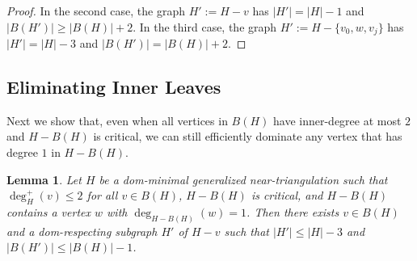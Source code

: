 \documentclass{article}
\newtheorem{lem}{Lemma}
\theoremstyle{definition}
\begin{document}
\begin{proof}
  In the second case, the graph $H':=H-v$ has $|H'|=|H|-1$ and $|B(H')|\ge |B(H)|+2$. In the third case, the graph $H':=H-\{v_0,w,v_j\}$ has $|H'|=|H|-3$ and $|B(H')|=|B(H)|+2$.
\end{proof}


\subsection{Eliminating Inner Leaves}
\label{one_kill_sec}

Next we show that, even when all vertices in $B(H)$ have inner-degree at most $2$ and $H-B(H)$ is critical, we can still efficiently dominate any vertex that has degree $1$ in $H-B(H)$.


\begin{lem}\label{leaf_killer}
  Let $H$ be a dom-minimal generalized near-triangulation such that $\deg^+_H(v)\le 2$ for all $v\in B(H)$, $H-B(H)$ is critical, and $H-B(H)$ contains a vertex $w$ with $\deg_{H-B(H)}(w)=1$.  Then there exists $v\in B(H)$ and a dom-respecting subgraph $H'$ of $H-v$ such that $|H'|\le |H|-3$ and $|B(H')|\le |B(H)|-1$.
\end{lem}
\end{document}
